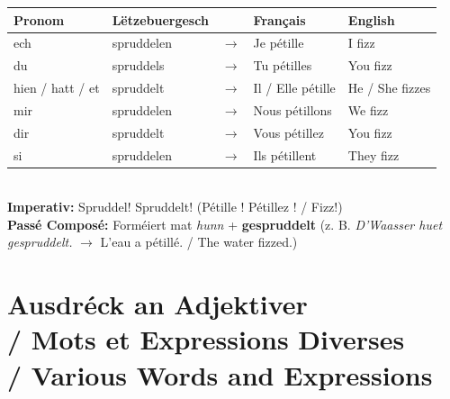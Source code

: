 \begin{tabular}{ll c l l}
    \toprule
    \textbf{Pronom} & \textbf{Lëtzebuergesch} & \textbf{} & \textbf{Français} & \textbf{English} \\
    \midrule
    ech & spruddelen & $\rightarrow$ & Je pétille & I fizz \\
    du & spruddels & $\rightarrow$ & Tu pétilles & You fizz \\
    hien / hatt / et & spruddelt & $\rightarrow$ & Il / Elle pétille & He / She fizzes \\
    \midrule
    mir & spruddelen & $\rightarrow$ & Nous pétillons & We fizz \\
    dir & spruddelt & $\rightarrow$ & Vous pétillez & You fizz \\
    si & spruddelen & $\rightarrow$ & Ils pétillent & They fizz \\
    \bottomrule
\end{tabular}
\\[1em]
\textbf{Imperativ:} Spruddel! Spruddelt! (Pétille ! Pétillez ! / Fizz!) \\
\textbf{Passé Composé:} Forméiert mat \textit{hunn} + \textbf{gespruddelt} (z. B. \textit{D'Waasser huet gespruddelt.} $\rightarrow$ L'eau a pétillé. / The water fizzed.)

\vspace{1cm}

\section[Ausdréck an Adjektiver / Expressions / Expressions]{Ausdréck an Adjektiver \\/ Mots et Expressions Diverses \\/ Various Words and Expressions}

